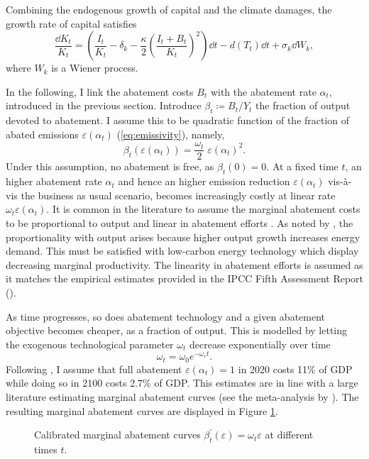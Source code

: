 \documentclass[../../main.tex]{subfiles}
\begin{document}
Combining the endogenous growth of capital and the climate damages, the growth rate of capital satisfies \begin{equation} \label{eq:growth-capital:nominal}
    \frac{\dd{K}_t}{K_t} = \left(\frac{I_t}{K_t} - \delta_k - \frac{\kappa}{2} \left( \frac{I_t + B_t}{K_t} \right)^2 \right) \dd{t} - d(T_t) \dd{t} + \sigma_k \dd{W}_k,
\end{equation} where $W_k$ is a Wiener process.


In the following, I link the abatement costs $B_t$ with the abatement rate $\alpha_t$, introduced in the previous section. Introduce $\beta_t \coloneqq B_t / Y_t$ the fraction of output devoted to abatement. I assume this to be quadratic function of the fraction of abated emissions $\varepsilon(\alpha_t)$ (\ref{eq:emissivity}), namely, \begin{equation} \label{eq:abatement-costs}
    \beta_t(\varepsilon(\alpha_t)) = \frac{\omega_t}{2} \; \varepsilon(\alpha_t)^2.
\end{equation} Under this assumption, no abatement is free, as $\beta_t(0) = 0$. At a fixed time $t$, an higher abatement rate $\alpha_t$ and hence an higher emission reduction $\varepsilon(\alpha_t)$ vis-à-vis the business as usual scenario, becomes increasingly costly at linear rate $\omega_t \varepsilon(\alpha_t)$. It is common in the literature to assume the marginal abatement costs to be proportional to output and linear in abatement efforts \citep{nordhaus_optimal_1992,nordhaus_revisiting_2017,baker_technical_2008, dietz_cumulative_2019}. As noted by \citet[p.112-113]{dietz_cumulative_2019}, the proportionality with output arises because higher output growth increases energy demand. This must be satisfied with low-carbon energy technology which display decreasing marginal productivity. The linearity in abatement efforts is assumed as it matches the empirical estimates provided in the IPCC Fifth Assessment Report (\citeyear{ipcc_climate_2023}).

As time progresses, so does abatement technology and a given abatement objective becomes cheaper, as a fraction of output. This is modelled by letting the exogenous technological parameter $\omega_t$ decrease exponentially over time \begin{equation}
    \omega_t = \omega_0 e^{-\omega_r t}.
\end{equation} Following \citep{nordhaus_revisiting_2017}, I assume that full abatement $\varepsilon(\alpha_t) = 1$ in 2020 costs 11\% of GDP while doing so in 2100 costs 2.7\% of GDP. This estimates are in line with a large literature estimating marginal abatement curves (see the meta-analysis by \citealt{kuik_marginal_2009}). The resulting marginal abatement curves are displayed in Figure \ref{fig:mac}. \begin{figure}[htbp]
    \centering
    
    \caption{Calibrated marginal abatement curves $\beta_t^\prime(\varepsilon) = \omega_t \varepsilon$ at different times $t$.}
    \label{fig:mac}
\end{figure}
\end{document}
